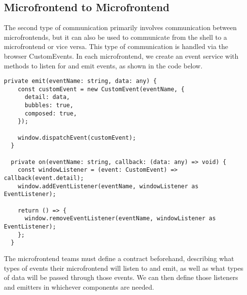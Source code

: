 \subsection*{Microfrontend to Microfrontend}
The second type of communication primarily involves communication between microfrontends, but it can also be used to communicate from the shell to a microfrontend or vice versa. This type of communication is handled via the browser CustomEvents. In each microfrontend, we create an event service with methods to listen for and emit events, as shown in the code below.
\begin{lstlisting}[caption={Event service implementation for microfrontend communication using CustomEvents}]
  private emit(eventName: string, data: any) {
    const customEvent = new CustomEvent(eventName, {
      detail: data,
      bubbles: true,
      composed: true,
    });
  
    window.dispatchEvent(customEvent);
  }
  
  private on(eventName: string, callback: (data: any) => void) {
    const windowListener = (event: CustomEvent) => callback(event.detail);
    window.addEventListener(eventName, windowListener as EventListener);
  
    return () => {
      window.removeEventListener(eventName, windowListener as EventListener);
    };
  }
\end{lstlisting}
The microfrontend teams must define a contract beforehand, describing what types of events their microfrontend will listen to and emit, as well as what types of data will be passed through those events. We can then define those listeners and emitters in whichever components are needed.
